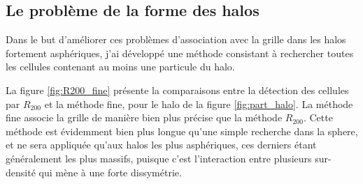 \subsection{Le problème de la forme des halos}

Dans le but d'améliorer ces problèmes d'association avec la grille dans les halos fortement asphériques, j'ai développé une méthode consistant à rechercher toutes les cellules contenant au moins une particule du halo.

La figure \ref{fig:R200_fine} présente la comparaisons entre la détection des cellules par $R_{200}$ et la méthode fine, pour le halo de la figure \ref{fig:part_halo}.
La méthode fine associe la grille de manière bien plus précise que la méthode $R_{200}$.
Cette méthode est évidemment bien plus longue qu'une simple recherche dans la sphere, et ne sera appliquée qu'aux halos les plus asphériques, ces derniers étant généralement les plus massifs, puisque c'est l'interaction entre plusieurs sur-densité qui mène à une forte dissymétrie.

